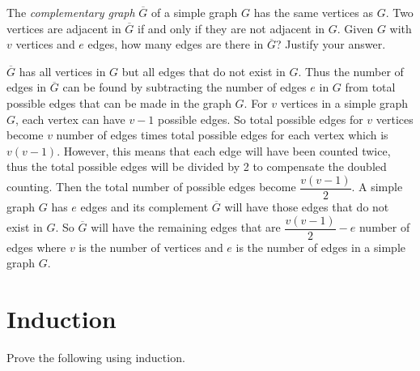 \documentclass[addpoints]{exam}
\begin{document}
\begin{questions}
\begin{solution}
  \end{solution}
  
\question[5] The \textit{complementary graph} $\overline{G}$ of a simple graph $G$ has the same vertices as  $G$. Two vertices are adjacent in $\overline{G}$ if and only if they are not adjacent in $G$. Given $G$ with $v$ vertices and $e$ edges, how many edges are there in $\overline{G}$? Justify your answer.
  \begin{solution}
    $\overline{G}$ has all vertices in $G$ but all edges that do not exist in $G$. Thus the number of edges in $\overline{G}$ can
    be found by subtracting the number of edges $e$ in $G$ from total possible edges that can be made in the graph $G$. For $v$ 
    vertices in a simple graph $G$, each vertex can have $v-1$ possible edges. So total possible edges for $v$ vertices become $v$ number 
    of edges times total possible edges for each vertex which is $v(v-1)$. However, this means that each edge will have been counted
    twice, thus the total possible edges will be divided by 2 to compensate the doubled counting. Then the total number of possible edges
    become $\dfrac{v(v-1)}{2}$. A simple graph $G$ has $e$ edges and its complement $\overline{G}$ will have those edges that do not 
    exist in $G$. So $\overline{G}$ will have the remaining edges that are $\dfrac{v(v-1)}{2} - e$ number of edges where $v$ 
    is the number of vertices and $e$ is the number of edges in a simple graph $G$. 
  \end{solution}
  
  \section*{Induction}
  
\question Prove the following using induction.
\end{questions}
\end{document}
